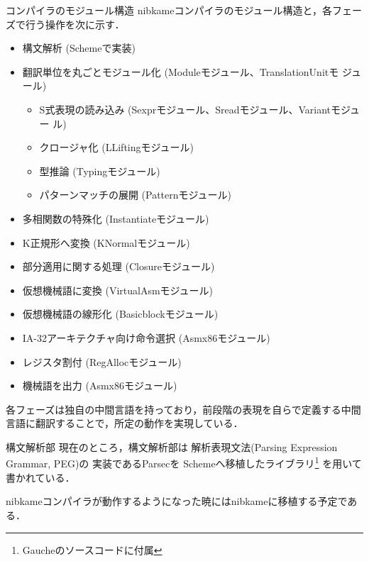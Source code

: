 \documentclass[a4paper,titlepage,report,disablejfam]{jsbook}
\begin{document}
\begin{resbonsiblesection}{コンパイラのモジュール構造}{\kobori}
nibkameコンパイラのモジュール構造と，各フェーズで行う操作を次に示す．

\begin{itemize}
 \item 構文解析 (Schemeで実装)
 \item 翻訳単位を丸ごとモジュール化 (Moduleモジュール、TranslationUnitモ
       ジュール)
 \begin{itemize}
  \item S式表現の読み込み (Sexprモジュール、Sreadモジュール、Variantモジュー
        ル)
  \item クロージャ化 (LLiftingモジュール)
  \item 型推論 (Typingモジュール)
  \item パターンマッチの展開 (Patternモジュール)
 \end{itemize}
 \item 多相関数の特殊化 (Instantiateモジュール)
 \item K正規形へ変換 (KNormalモジュール)
 \item 部分適用に関する処理 (Closureモジュール)
 \item 仮想機械語に変換 (VirtualAsmモジュール)
 \item 仮想機械語の線形化 (Basicblockモジュール)
 \item IA-32アーキテクチャ向け命令選択 (Asmx86モジュール)
 \item レジスタ割付 (RegAllocモジュール)
 \item 機械語を出力 (Asmx86モジュール)
\end{itemize}

各フェーズは独自の中間言語を持っており，前段階の表現を自らで定義する中間
言語に翻訳することで，所定の動作を実現している．
\end{resbonsiblesection}

\begin{resbonsiblesection}{構文解析部}{\sakamoto}\label{sc:impl-parsing}
現在のところ，構文解析部は
解析表現文法(Parsing Expression Grammar, PEG)\cite{Ford:2004:PEG:982962.964011}の
実装であるParsec\cite{Hutton96monadicparser}を
Schemeへ移植したライブラリ\footnote{Gaucheのソースコードに付属}
を用いて書かれている．

nibkameコンパイラが動作するようになった暁にはnibkameに移植する予定である．
\end{resbonsiblesection}
\end{document}
